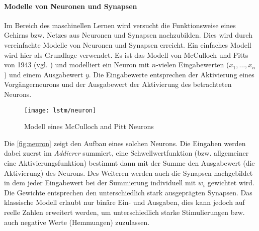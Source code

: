 \paragraph{Modelle von Neuronen und Synapsen}
Im Bereich des maschinellen Lernen wird versucht die Funktionsweise eines
Gehirns bzw. Netzes aus Neuronen und Synapsen nachzubilden. Dies wird durch
vereinfachte Modelle von Neuronen und Synapsen erreicht. Ein einfaches Modell
wird hier als Grundlage verwendet. Es ist das Modell von McCulloch und Pitts von
1943 (vgl. \cite{Mcc43}) und modelliert ein Neuron mit $n$-vielen Eingabewerten
($x_1,\ldots,x_n$) und einem Ausgabewert $y$. Die Eingabewerte entsprechen der
Aktivierung eines Vorgängerneurons und der Ausgabewert der Aktivierung des
betrachteten Neurons.
\begin{figure}[htbp]
    \centering
   \texttt{[image: lstm/neuron]}
\caption{Modell eines McCulloch and Pitt Neurons}
\label{fig:neuron}
\end{figure}  
Die \autoref{fig:neuron} zeigt den Aufbau eines solchen Neurons. Die Eingaben
werden dabei zuerst im \textit{Addierer} summiert, eine Schwellwertfunktion (bzw.
allgemeiner eine Aktivierungsfunktion) bestimmt dann mit der Summe den
Ausgabewert (die Aktivierung) des Neurons. Des Weiteren werden auch die Synapsen
nachgebildet in dem jeder Eingabewert bei der Summierung individuell mit $w_i$
gewichtet wird. Die Gewichte entsprechen den unterschiedlich stark ausgeprägten
Synapsen.
Das klassische Modell erlaubt nur binäre Ein- und Ausgaben, dies kann jedoch auf
reelle Zahlen erweitert werden, um unterschiedlich starke Stimulierungen bzw.
auch negative Werte (Hemmungen) zuzulassen.

